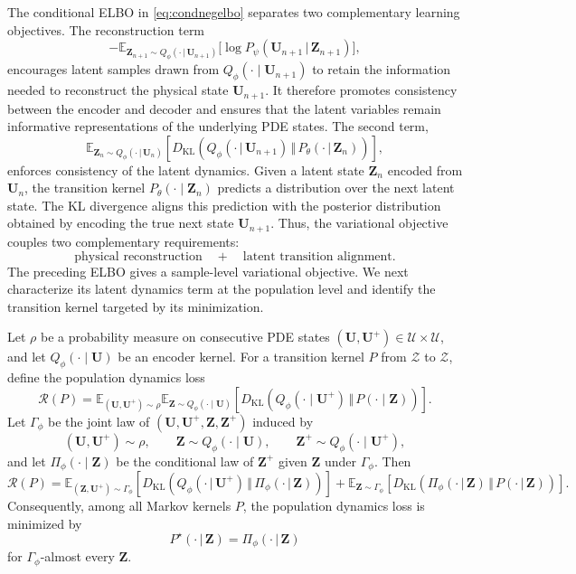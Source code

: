 \documentclass[11pt]{article}
\newcommand{\bbE}{\mathbb{E}}
\begin{document}
The conditional ELBO in \eqref{eq:condnegelbo} separates two complementary learning objectives. The reconstruction term
\[
    -
    \mathbb E_{\mathbf Z_{n+1}\sim Q_\phi(\cdot\,|\,\mathbf U_{n+1})}
    \big[\log P_\psi(\mathbf U_{n+1}\,|\,\mathbf Z_{n+1})\big],
\]
encourages latent samples drawn from $Q_\phi(\cdot\mid\mathbf U_{n+1})$ to retain the information needed to reconstruct the physical state $\mathbf U_{n+1}$. It therefore promotes consistency between the encoder and decoder and ensures that the latent variables remain informative representations of the underlying PDE states. The second term,
\[
    \mathbb E_{\mathbf Z_n\sim Q_\phi(\cdot\,|\,\mathbf U_n)}
    \left[D_{\mathrm{KL}}
    \left(
        Q_\phi(\cdot\,|\,\mathbf U_{n+1})\,\Vert\,P_\theta(\cdot\,|\,\mathbf Z_n)
    \right)\right],
\]
enforces consistency of the latent dynamics. Given a latent state $\mathbf Z_n$ encoded from $\mathbf U_n$, the transition kernel $P_\theta(\cdot\mid\mathbf Z_n)$ predicts a distribution over the next latent state. The KL divergence aligns this prediction with the posterior distribution obtained by encoding the true next state $\mathbf U_{n+1}$. Thus, the variational objective couples two complementary requirements:
\[
    \text{physical reconstruction}\quad+\quad\text{latent transition alignment}.
\]
The preceding ELBO gives a sample-level variational objective. We next characterize its latent dynamics term at the population level and identify the transition kernel targeted by its minimization.


\begin{proposition}
\label{prop:population_elbo_transition_consistency}
Let $\rho$ be a probability measure on consecutive PDE states $(\mathbf U,\mathbf U^+)\in\mathcal U\times\mathcal U$, and let $Q_\phi(\cdot\mid\mathbf U)$ be an encoder kernel. For a transition kernel $P$ from $\mathcal Z$ to $\mathcal Z$, define the population dynamics loss
\[
\mathcal R(P)=\mathbb E_{(\mathbf U,\mathbf U^+)\sim\rho} \mathbb E_{\mathbf Z\sim Q_\phi(\cdot\mid\mathbf U)} \left[D_{\mathrm{KL}}\left(Q_\phi(\cdot\mid\mathbf U^+)
\,\Vert\,P(\cdot\mid\mathbf Z)\right)\right].
\]
Let $\Gamma_\phi$ be the joint law of $(\mathbf{U},\mathbf{U}^+,\mathbf{Z},\mathbf{Z}^+)$ induced by
\[
    (\mathbf U,\mathbf U^+)\sim\rho,\qquad
    \mathbf Z\sim Q_\phi(\cdot\mid\mathbf U),\qquad
    \mathbf Z^+\sim Q_\phi(\cdot\mid\mathbf U^+),
\]
and let $\Pi_\phi(\cdot\mid\mathbf Z)$ be the conditional law of
$\mathbf Z^+$ given $\mathbf Z$ under $\Gamma_\phi$. Then
\begin{equation}
\mathcal R(P)=\bbE_{(\mathbf{Z},\mathbf{U}^+)\sim\Gamma_\phi}\left[D_{\mathrm{KL}}
    \left(Q_\phi(\cdot\,|\,\mathbf U^+)\,\Vert\,\Pi_\phi(\cdot\,|\,\mathbf Z)
    \right)\right]+
\bbE_{\mathbf{Z}\sim\Gamma_\phi}\left[D_{\mathrm{KL}}
    \left(\Pi_\phi(\cdot\,|\,\mathbf Z)\,\Vert\,P(\cdot\,|\,\mathbf Z)
    \right)\right].\label{eq:elbokldecomp}
\end{equation}
Consequently, among all Markov kernels
$P$, the population dynamics loss is minimized by
\[
    P^\star(\cdot\,|\,\mathbf Z)=\Pi_\phi(\cdot\,|\,\mathbf Z)
\]
for $\Gamma_\phi$-almost every $\mathbf Z$. 
\end{proposition}
\end{document}
